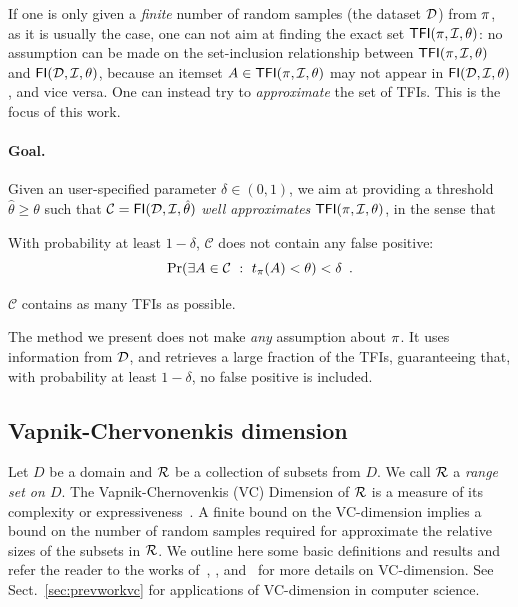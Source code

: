If one is only given a \emph{finite} number of random samples (the dataset
${\cal D}$) from $\pi$, as it is usually the case, one can not aim at finding the
exact set $\mathsf{TFI}(\pi,{\cal I},\theta)$: no assumption can be made on the
set-inclusion relationship between $\mathsf{TFI}(\pi,{\cal I},\theta)$ and
$\mathsf{FI}({\cal D},{\cal I},\theta)$, because an itemset $A\in\mathsf{TFI}(\pi,{\cal I},\theta)$ may not
appear in $\mathsf{FI}({\cal D},{\cal I},\theta)$, and vice versa. One can instead try to
\emph{approximate} the set of TFIs. This is the focus of this work.

\paragraph{Goal.} Given an user-specified
parameter $\delta\in(0,1)$, we aim at providing a threshold
$\hat{\theta}\ge\theta$ such that $\mathcal{C}=\mathsf{FI}({\cal D},{\cal I},\hat{\theta})$
\emph{well approximates} $\mathsf{TFI}(\pi,{\cal I},\theta)$, in the sense that
\begin{enumerate*}
  \item With probability at least $1-\delta$, $\mathcal{C}$ does not contain any
    false positive:
  \[
  \Pr(\exists A\in\mathcal{C} ~:~ t_\pi(A)<\theta)<\delta\enspace.\]
\item $\mathcal{C}$ contains as many TFIs as possible.

  \end{enumerate*}
The method we present does not make \emph{any} assumption about $\pi$. It uses
information from ${\cal D}$, and retrieves a large fraction of the TFIs, guaranteeing 
that, with probability at least $1-\delta$, no false positive is included.

\subsection{Vapnik-Chervonenkis dimension}\label{sec:prelvcdim}
Let $D$ be a domain and $\mathcal{R}$ be a collection of subsets from $D$. We call $\mathcal{R}$ a
\emph{range set on $D$}. The Vapnik-Chernovenkis (VC) Dimension of $\mathcal{R}$ is
a measure of its complexity or expressiveness~\cite{VapnikC71}. A finite bound
on the VC-dimension implies a bound on the number of random samples
required for approximate the relative sizes of the subsets in $\mathcal{R}$. We
outline here some basic definitions and results and refer the reader to the
works of~\citet[Chap.~3]{MohriRT12}, \citet[Sect.~3]{BoucheronBL05},
and~\citet{Vapnik99} for more details on VC-dimension. See
Sect.~\ref{sec:prevworkvc} for applications of VC-dimension in computer science.

